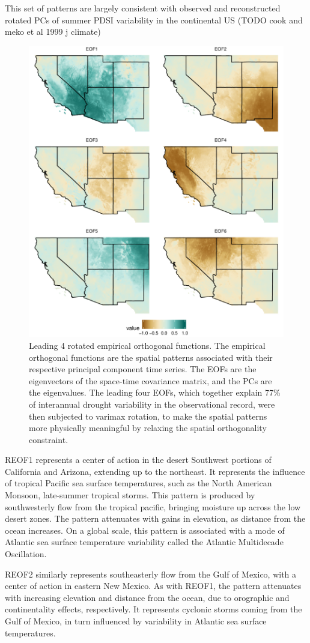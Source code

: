 \documentclass[fleqn,10pt]{wlscirep}
\begin{document}
This set of patterns are largely consistent with observed and reconstructed rotated PCs of summer PDSI variability in the continental US (TODO cook and meko et al 1999 j climate)

\begin{figure}[h]
\centering
\includegraphics[width=.6\linewidth]{figures/reof_observed.pdf}
\caption{Leading 4 rotated empirical orthogonal functions. The empirical orthogonal functions are the spatial patterns associated with their respective principal component time series. The EOFs are the eigenvectors of the space-time covariance matrix, and the PCs are the eigenvalues. The leading four EOFs, which together explain 77\% of interannual drought variability in the observational record, were then subjected to varimax rotation, to make the spatial patterns more physically meaningful by relaxing the spatial orthogonality constraint.}
\label{fig:reofs}
\end{figure}

REOF1 represents a center of action in the desert Southwest portions of California and Arizona, extending up to the northeast. It represents the influence of tropical Pacific sea surface temperatures, such as the North American Monsoon, late-summer tropical storms. This pattern is produced by southwesterly flow from the tropical pacific, bringing moisture up across the low desert zones. The pattern attenuates with gains in elevation, as distance from the ocean increases. On a global scale, this pattern is associated with a mode of Atlantic sea surface temperature variability called the Atlantic Multidecade Oscillation.

REOF2 similarly represents southeasterly flow from the Gulf of Mexico, with a center of action in eastern New Mexico. As with REOF1, the pattern attenuates with increasing elevation and distance from the ocean, due to orographic and continentality effects, respectively. It represents cyclonic storms coming from the Gulf of Mexico, in turn influenced by variability in Atlantic sea surface temperatures. 
\end{document}
